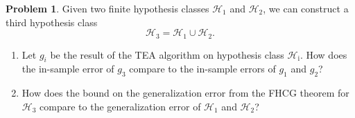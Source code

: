 \documentclass[10pt]{exam}
\theoremstyle{definition}
\newtheorem{problem}{Problem}
\newcommand{\HH}[1]{\mathcal H_{\text{#1}}}
\begin{document}
\newpage
\begin{problem}
    Given two finite hypothesis classes $\HH{1}$ and $\HH{2}$, we can construct a third hypothesis class
    \begin{equation}
        \HH{3} = \HH{1} \cup \HH{2}.
    \end{equation}
    \begin{enumerate}
        \item
            Let $g_i$ be the result of the TEA algorithm on hypothesis class $\HH{i}$.
            How does the in-sample error of $g_3$ compare to the in-sample errors of $g_1$ and $g_2$?

            \vspace{4in}
        \item
            How does the bound on the generalization error from the FHCG theorem for $\HH{3}$ compare to the generalization error of $\HH{1}$ and $\HH{2}$?
    \end{enumerate}
\end{problem}
\end{document}
